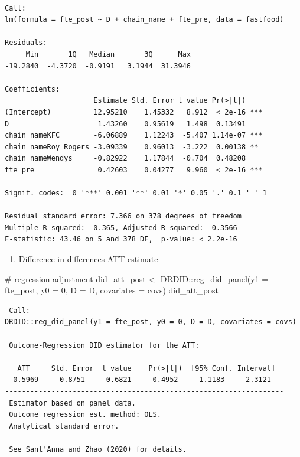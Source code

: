 \documentclass[
  letterpaper,
  DIV=11,
  numbers=noendperiod]{scrreprt}
\newenvironment{Shaded}{\begin{snugshade}}{\end{snugshade}}
\newcommand{\AttributeTok}[1]{\textcolor[rgb]{0.40,0.45,0.13}{#1}}
\newcommand{\CommentTok}[1]{\textcolor[rgb]{0.37,0.37,0.37}{#1}}
\newcommand{\DecValTok}[1]{\textcolor[rgb]{0.68,0.00,0.00}{#1}}
\newcommand{\FunctionTok}[1]{\textcolor[rgb]{0.28,0.35,0.67}{#1}}
\newcommand{\NormalTok}[1]{\textcolor[rgb]{0.00,0.23,0.31}{#1}}
\newcommand{\OtherTok}[1]{\textcolor[rgb]{0.00,0.23,0.31}{#1}}
\newcommand{\SpecialCharTok}[1]{\textcolor[rgb]{0.37,0.37,0.37}{#1}}
\providecommand{\tightlist}{%
  \setlength{\itemsep}{0pt}\setlength{\parskip}{0pt}}\usepackage{longtable,booktabs,array}
\begin{document}
\begin{verbatim}

Call:
lm(formula = fte_post ~ D + chain_name + fte_pre, data = fastfood)

Residuals:
     Min       1Q   Median       3Q      Max 
-19.2840  -4.3720  -0.9191   3.1944  31.3946 

Coefficients:
                     Estimate Std. Error t value Pr(>|t|)    
(Intercept)          12.95210    1.45332   8.912  < 2e-16 ***
D                     1.43260    0.95619   1.498  0.13491    
chain_nameKFC        -6.06889    1.12243  -5.407 1.14e-07 ***
chain_nameRoy Rogers -3.09339    0.96013  -3.222  0.00138 ** 
chain_nameWendys     -0.82922    1.17844  -0.704  0.48208    
fte_pre               0.42603    0.04277   9.960  < 2e-16 ***
---
Signif. codes:  0 '***' 0.001 '**' 0.01 '*' 0.05 '.' 0.1 ' ' 1

Residual standard error: 7.366 on 378 degrees of freedom
Multiple R-squared:  0.365, Adjusted R-squared:  0.3566 
F-statistic: 43.46 on 5 and 378 DF,  p-value: < 2.2e-16
\end{verbatim}

\begin{enumerate}
\def\labelenumi{\arabic{enumi}.}
\setcounter{enumi}{4}
\tightlist
\item
  Difference-in-differences ATT estimate
\end{enumerate}

\begin{Shaded}
\begin{Highlighting}[]
\CommentTok{\# regression adjustment}
\NormalTok{did\_att\_post }\OtherTok{\textless{}{-}}\NormalTok{ DRDID}\SpecialCharTok{::}\FunctionTok{reg\_did\_panel}\NormalTok{(}\AttributeTok{y1 =}\NormalTok{ fte\_post, }\AttributeTok{y0 =} \DecValTok{0}\NormalTok{, }\AttributeTok{D =}\NormalTok{ D, }\AttributeTok{covariates =}\NormalTok{ covs)}
\NormalTok{did\_att\_post}
\end{Highlighting}
\end{Shaded}

\begin{verbatim}
 Call:
DRDID::reg_did_panel(y1 = fte_post, y0 = 0, D = D, covariates = covs)
------------------------------------------------------------------
 Outcome-Regression DID estimator for the ATT:
 
   ATT     Std. Error  t value    Pr(>|t|)  [95% Conf. Interval] 
  0.5969     0.8751     0.6821     0.4952    -1.1183     2.3121  
------------------------------------------------------------------
 Estimator based on panel data.
 Outcome regression est. method: OLS.
 Analytical standard error.
------------------------------------------------------------------
 See Sant'Anna and Zhao (2020) for details.
\end{verbatim}
\end{document}
